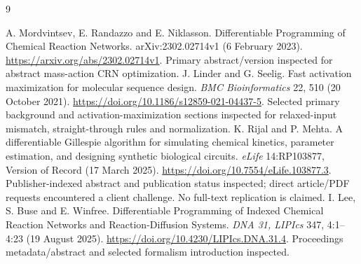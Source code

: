 \renewcommand{\bibname}{Sources and references}
\begin{thebibliography}{9}
 A. Mordvintsev, E. Randazzo and E. Niklasson.
Differentiable Programming of Chemical Reaction Networks.
arXiv:2302.02714v1 (6 February 2023).
\url{https://arxiv.org/abs/2302.02714v1}.
Primary abstract/version inspected for abstract mass-action CRN optimization.
 J. Linder and G. Seelig.
Fast activation maximization for molecular sequence design.
\emph{BMC Bioinformatics} 22, 510 (20 October 2021).
\url{https://doi.org/10.1186/s12859-021-04437-5}.
Selected primary background and activation-maximization sections inspected
for relaxed-input mismatch, straight-through rules and normalization.
 K. Rijal and P. Mehta.
A differentiable Gillespie algorithm for simulating chemical kinetics,
parameter estimation, and designing synthetic biological circuits.
\emph{eLife} 14:RP103877, Version of Record (17 March 2025).
\url{https://doi.org/10.7554/eLife.103877.3}.
Publisher-indexed abstract and publication status inspected; direct article/PDF
requests encountered a client challenge. No full-text replication is claimed.
 I. Lee, S. Buse and E. Winfree.
Differentiable Programming of Indexed Chemical Reaction Networks and
Reaction-Diffusion Systems.
\emph{DNA 31, LIPIcs} 347, 4:1--4:23 (19 August 2025).
\url{https://doi.org/10.4230/LIPIcs.DNA.31.4}.
Proceedings metadata/abstract and selected formalism introduction inspected.
\end{thebibliography}
